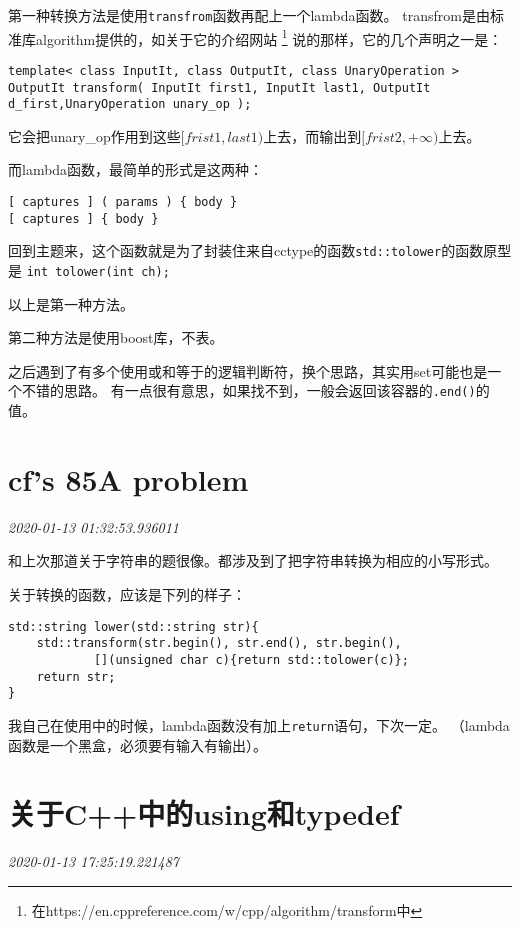 \documentclass{peterlitsdoc}
\newcommand{\timetx}[1]
    {\par\noindent\emph{\pltgray\small #1}\vspace{2em}}
\newcommand{\vb}{\verb}
\begin{document}
 第一种转换方法是使用\vb|transfrom|函数再配上一个lambda函数。
 transfrom是由标准库algorithm提供的，如关于它的介绍网站%
 \footnote{在https://en.cppreference.com/w/cpp/algorithm/transform中}%
 说的那样，它的几个声明之一是：

 \begin{lstlisting}
template< class InputIt, class OutputIt, class UnaryOperation >
OutputIt transform( InputIt first1, InputIt last1, OutputIt d_first,UnaryOperation unary_op );
\end{lstlisting}

它会把unary\_op作用到这些$[frist1, last1)$上去，而输出到$[frist2, +\infty)$上去。

而lambda函数，最简单的形式是这两种：

\begin{lstlisting}
[ captures ] ( params ) { body }
[ captures ] { body }
\end{lstlisting}

回到主题来，这个函数就是为了封装住来自cctype的函数\vb|std::tolower|的函数原型是
\vb|int tolower(int ch);|

以上是第一种方法。

第二种方法是使用boost库，不表。

之后遇到了有多个使用或和等于的逻辑判断符，换个思路，其实用set可能也是一个不错的思路。
有一点很有意思，如果找不到，一般会返回该容器的\vb|.end()|的值。



\section{cf's 85A problem}\timetx{2020-01-13 01:32:53.936011}

和上次那道关于字符串的题很像。都涉及到了把字符串转换为相应的小写形式。

关于转换的函数，应该是下列的样子：

\begin{lstlisting}
std::string lower(std::string str){
    std::transform(str.begin(), str.end(), str.begin(),
            [](unsigned char c){return std::tolower(c)};
    return str;
}
\end{lstlisting}

我自己在使用中的时候，lambda函数没有加上\vb|return|语句，下次一定。
（lambda函数是一个黑盒，必须要有输入有输出）。


\section{关于C++中的using和typedef}\timetx{2020-01-13 17:25:19.221487}
\end{document}
